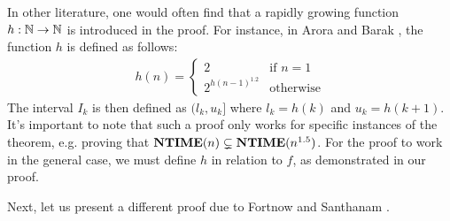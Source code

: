\begin{remark}
  In other literature, one would often find that a rapidly growing function $h : \mathbb N \to \mathbb N$ is introduced in the proof. For instance, in Arora and Barak \cite{arora2009computational}, the function $h$ is defined as follows:
  \begin{align*}
    h(n) =
    \begin{cases}
      2 & \text{if $n = 1$} \\
      2^{h(n - 1)^{1.2}} & \text{otherwise}
    \end{cases}
  \end{align*}
  The interval $I_k$ is then defined as $(l_k, u_k]$ where $l_k = h(k)$ and $u_k = h(k + 1)$. It's important to note that such a proof only works for specific instances of the theorem, e.g. proving that $\textbf{NTIME}(n) \subsetneq \textbf{NTIME}(n^{1.5})$. For the proof to work in the general case, we must define $h$ in relation to $f$, as demonstrated in our proof.
\end{remark}

Next, let us present a different proof due to Fortnow and Santhanam \cite{fortnow2011robust}.

